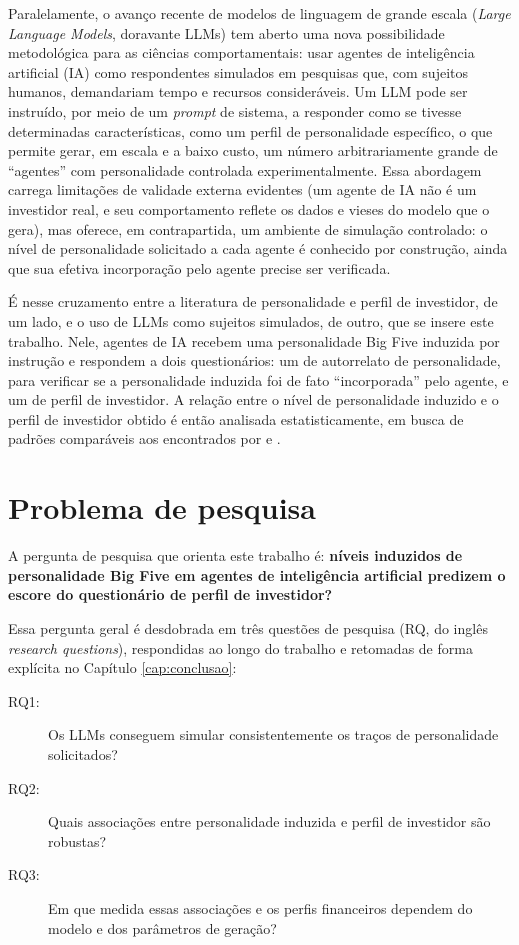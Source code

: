 Paralelamente, o avanço recente de modelos de linguagem de grande escala
(\textit{Large Language Models}, doravante LLMs) tem aberto uma nova possibilidade
metodológica para as ciências comportamentais: usar agentes de
inteligência artificial (IA) como respondentes simulados em pesquisas que, com
sujeitos humanos, demandariam tempo e recursos consideráveis. Um LLM pode
ser instruído, por meio de um \textit{prompt} de sistema, a responder como
se tivesse determinadas características, como um perfil de
personalidade específico, o que permite gerar, em escala e a baixo
custo, um número arbitrariamente grande de ``agentes'' com personalidade
controlada experimentalmente. Essa abordagem carrega limitações de
validade externa evidentes (um agente de IA não é um investidor real, e
seu comportamento reflete os dados e vieses do modelo que o gera), mas
oferece, em contrapartida, um ambiente de simulação controlado: o nível
de personalidade solicitado a cada agente é conhecido por construção,
ainda que sua efetiva incorporação pelo agente precise ser verificada.

É nesse cruzamento entre a literatura de personalidade e perfil de
investidor, de um lado, e o uso de LLMs como sujeitos simulados, de outro,
que se insere este trabalho. Nele, agentes de IA recebem uma personalidade
Big Five induzida por instrução e respondem a dois questionários: um de
autorrelato de personalidade, para verificar se a personalidade induzida
foi de fato ``incorporada'' pelo agente, e um de perfil de investidor. A
relação entre o nível de personalidade induzido e o perfil de investidor
obtido é então analisada estatisticamente, em busca de padrões
comparáveis aos encontrados por  e
.

\section{Problema de pesquisa}

A pergunta de pesquisa que orienta este trabalho é: \textbf{níveis
induzidos de personalidade Big Five em agentes de inteligência artificial
predizem o escore do questionário de perfil de investidor?}

Essa pergunta geral é desdobrada em três questões de pesquisa (RQ, do
inglês \textit{research questions}), respondidas ao longo do trabalho e
retomadas de forma explícita no Capítulo \ref{cap:conclusao}:

\begin{description}
    \item[RQ1:] Os LLMs conseguem simular consistentemente os traços de
    personalidade solicitados?
    \item[RQ2:] Quais associações entre personalidade induzida e perfil de
    investidor são robustas?
    \item[RQ3:] Em que medida essas associações e os perfis financeiros
    dependem do modelo e dos parâmetros de geração?
\end{description}

